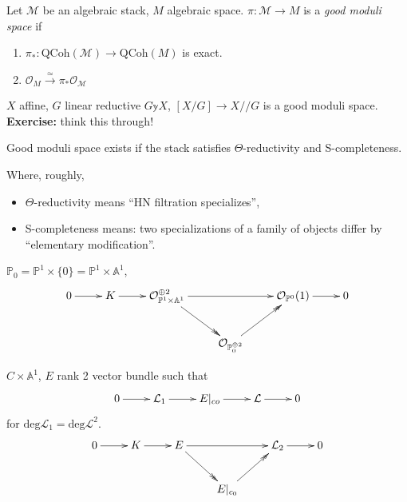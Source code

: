 \begin{definition}
\label{definition-good-moduli-space}
Let $\mathcal{M}$ be an algebraic stack, $M$ algebraic space. 
$\pi:\mathcal{M} \to M$ is a {\it good moduli space} if
\begin{enumerate}
\item $\pi_* :\text{QCoh}(\mathcal{M}) \to \text{QCoh}(M)$ is exact.
\item $\mathcal{O}_M \xrightarrow{\simeq }\pi_*\mathcal{O}_{\mathcal{M}}$
\end{enumerate}
\end{definition}

\begin{example}
\label{example-good-moduli-space}
$X$ affine, $G$ linear reductive $G \mathbb{y} X$, $[X/G] \to X/\!/G$ is a good
moduli space. {\bf Exercise:} think this through!
\end{example}

\begin{theorem}
\label{theorem-AHLH}
Good moduli space exists if the stack satisfies $\Theta$-reductivity and
S-completeness.
\end{theorem}

Where, roughly,
\begin{itemize}
\item $\Theta$-reductivity means ``HN filtration specializes'',
\item S-completeness means: two specializations of a family of objects differ by
 ``elementary modification''.
\end{itemize}

\begin{example}
\label{example-elementary-modification}
$\mathbb{P}_0=\mathbb{P}^1 \times \{0\} = \mathbb{P}^1 \times \mathbb{A}^1$,
$$
\xymatrix{
0\ar[r]&  K \ar[r]&  \mathcal{O}_{\mathbb{P}^1\times\mathbb{A}^1}^{\oplus 2}
\ar[rr]\ar@{->>}[rd]&  &  \mathcal{O}_{\mathbb{P}^0}(1) \ar[r]&  0\\
&  &  &  \mathcal{O}_{\mathbb{P}_0^{\oplus 2}}\ar@{->>}[ur]
}
$$
\end{example}

\begin{example}
\label{example-elementary-modification-2}
$C \times \mathbb{A}^1$, $E$ rank 2 vector bundle such that
$$
\xymatrix{
0\ar[r]&\mathcal{L}_1\ar[r]&E|_{co}\ar[r]&\mathcal{L}\ar[r]&0
}
$$
for $\text{deg}\mathcal{L}_1=\text{deg}\mathcal{L}^2$.
$$
\xymatrix{
0\ar[r]&  K \ar[r]& E\ar[rr]\ar@{->>}[rd]
&  &  \mathcal{L}_2 \ar[r]&  0\\
&  &  &  E|_{c_0}\ar@{->>}[ur]
}
$$
\end{example}

